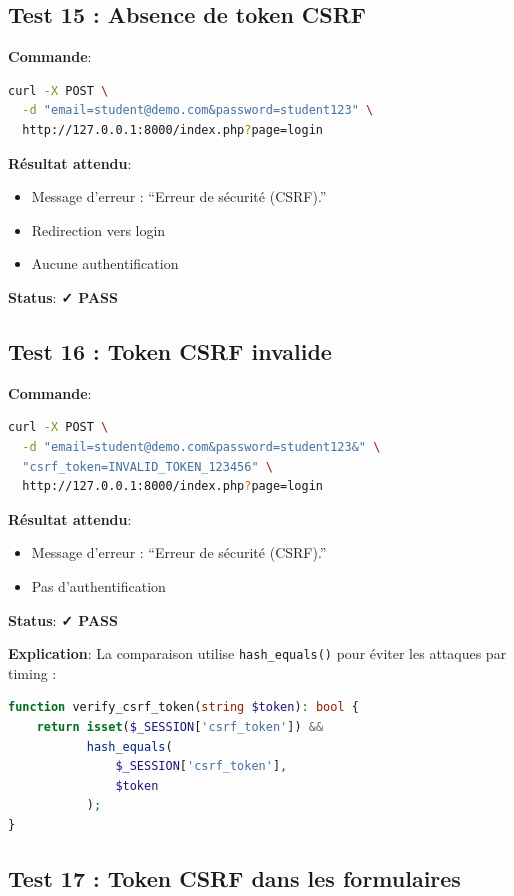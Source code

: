 \documentclass[11pt,a4paper,french]{report}
\newcommand{\pass}{\cellcolor{pass}\textbf{\color{white}✓ PASS}}
\begin{document}
\subsection{Test 15 : Absence de token CSRF}

\textbf{Commande}:
\begin{lstlisting}[language=bash]
curl -X POST \
  -d "email=student@demo.com&password=student123" \
  http://127.0.0.1:8000/index.php?page=login
\end{lstlisting}

\textbf{Résultat attendu}:
\begin{itemize}
    \item Message d'erreur : ``Erreur de sécurité (CSRF).''
    \item Redirection vers login
    \item Aucune authentification
\end{itemize}

\textbf{Status}: \pass

\subsection{Test 16 : Token CSRF invalide}

\textbf{Commande}:
\begin{lstlisting}[language=bash]
curl -X POST \
  -d "email=student@demo.com&password=student123&" \
  "csrf_token=INVALID_TOKEN_123456" \
  http://127.0.0.1:8000/index.php?page=login
\end{lstlisting}

\textbf{Résultat attendu}:
\begin{itemize}
    \item Message d'erreur : ``Erreur de sécurité (CSRF).''
    \item Pas d'authentification
\end{itemize}

\textbf{Status}: \pass

\textbf{Explication}: La comparaison utilise \texttt{hash\_equals()} 
pour éviter les attaques par timing :

\begin{lstlisting}[language=PHP]
function verify_csrf_token(string $token): bool {
    return isset($_SESSION['csrf_token']) &&
           hash_equals(
               $_SESSION['csrf_token'], 
               $token
           );
}
\end{lstlisting}

\subsection{Test 17 : Token CSRF dans les formulaires}
\end{document}
